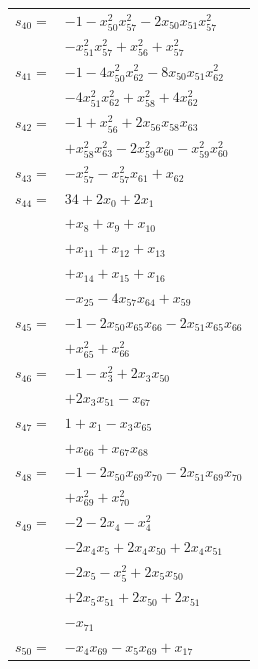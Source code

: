 \begin{longtable}{@{}r@{\;}l@{}}
\(s_{40}=\) & \(\displaystyle -1 -x_{50}^{2}x_{57}^{2} -2x_{50}x_{51}x_{57}^{2}\) \\
 & \(\displaystyle -x_{51}^{2}x_{57}^{2} +x_{56}^{2} +x_{57}^{2}\) \\[3pt]
\(s_{41}=\) & \(\displaystyle -1 -4x_{50}^{2}x_{62}^{2} -8x_{50}x_{51}x_{62}^{2}\) \\
 & \(\displaystyle -4x_{51}^{2}x_{62}^{2} +x_{58}^{2} +4x_{62}^{2}\) \\[3pt]
\(s_{42}=\) & \(\displaystyle -1 +x_{56}^{2} +2x_{56}x_{58}x_{63}\) \\
 & \(\displaystyle +x_{58}^{2}x_{63}^{2} -2x_{59}^{2}x_{60} -x_{59}^{2}x_{60}^{2}\) \\[3pt]
\(s_{43}=\) & \(\displaystyle -x_{57}^{2} -x_{57}^{2}x_{61} +x_{62}\) \\[3pt]
\(s_{44}=\) & \(\displaystyle 34 +2x_{0} +2x_{1}\) \\
 & \(\displaystyle +x_{8} +x_{9} +x_{10}\) \\
 & \(\displaystyle +x_{11} +x_{12} +x_{13}\) \\
 & \(\displaystyle +x_{14} +x_{15} +x_{16}\) \\
 & \(\displaystyle -x_{25} -4x_{57}x_{64} +x_{59}\) \\[3pt]
\(s_{45}=\) & \(\displaystyle -1 -2x_{50}x_{65}x_{66} -2x_{51}x_{65}x_{66}\) \\
 & \(\displaystyle +x_{65}^{2} +x_{66}^{2}\) \\[3pt]
\(s_{46}=\) & \(\displaystyle -1 -x_{3}^{2} +2x_{3}x_{50}\) \\
 & \(\displaystyle +2x_{3}x_{51} -x_{67}\) \\[3pt]
\(s_{47}=\) & \(\displaystyle 1 +x_{1} -x_{3}x_{65}\) \\
 & \(\displaystyle +x_{66} +x_{67}x_{68}\) \\[3pt]
\(s_{48}=\) & \(\displaystyle -1 -2x_{50}x_{69}x_{70} -2x_{51}x_{69}x_{70}\) \\
 & \(\displaystyle +x_{69}^{2} +x_{70}^{2}\) \\[3pt]
\(s_{49}=\) & \(\displaystyle -2 -2x_{4} -x_{4}^{2}\) \\
 & \(\displaystyle -2x_{4}x_{5} +2x_{4}x_{50} +2x_{4}x_{51}\) \\
 & \(\displaystyle -2x_{5} -x_{5}^{2} +2x_{5}x_{50}\) \\
 & \(\displaystyle +2x_{5}x_{51} +2x_{50} +2x_{51}\) \\
 & \(\displaystyle -x_{71}\) \\[3pt]
\(s_{50}=\) & \(\displaystyle -x_{4}x_{69} -x_{5}x_{69} +x_{17}\) \\

\end{longtable}
